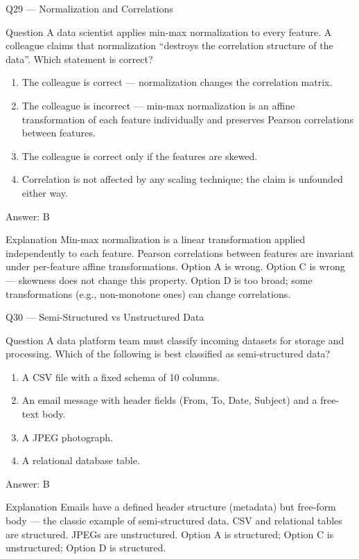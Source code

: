 \documentclass[aspectratio=169,8pt]{beamer}
\begin{document}
	\begin{frame}{Q29 --- Normalization and Correlations}
		\begin{block}{Question}
			A data scientist applies min-max normalization to every feature. A colleague claims that normalization ``destroys the correlation structure of the data''. Which statement is correct?
		\end{block}
		\begin{enumerate}
			\item The colleague is correct --- normalization changes the correlation matrix.
			\item The colleague is incorrect --- min-max normalization is an affine transformation of each feature individually and preserves Pearson correlations between features.
			\item The colleague is correct only if the features are skewed.
			\item Correlation is not affected by any scaling technique; the claim is unfounded either way.
		\end{enumerate}
		\begin{exampleblock}{Answer: B}\end{exampleblock}
		\begin{block}{Explanation}
			Min-max normalization is a linear transformation applied independently to each feature. Pearson correlations between features are invariant under per-feature affine transformations. Option A is wrong. Option C is wrong --- skewness does not change this property. Option D is too broad; some transformations (e.g., non-monotone ones) can change correlations.
		\end{block}
	\end{frame}
	
	\begin{frame}{Q30 --- Semi-Structured vs Unstructured Data}
		\begin{block}{Question}
			A data platform team must classify incoming datasets for storage and processing. Which of the following is best classified as semi-structured data?
		\end{block}
		\begin{enumerate}
			\item A CSV file with a fixed schema of 10 columns.
			\item An email message with header fields (From, To, Date, Subject) and a free-text body.
			\item A JPEG photograph.
			\item A relational database table.
		\end{enumerate}
		\begin{exampleblock}{Answer: B}\end{exampleblock}
		\begin{block}{Explanation}
			Emails have a defined header structure (metadata) but free-form body --- the classic example of semi-structured data. CSV and relational tables are structured. JPEGs are unstructured. Option A is structured; Option C is unstructured; Option D is structured.
		\end{block}
	\end{frame}
	
\end{document}
